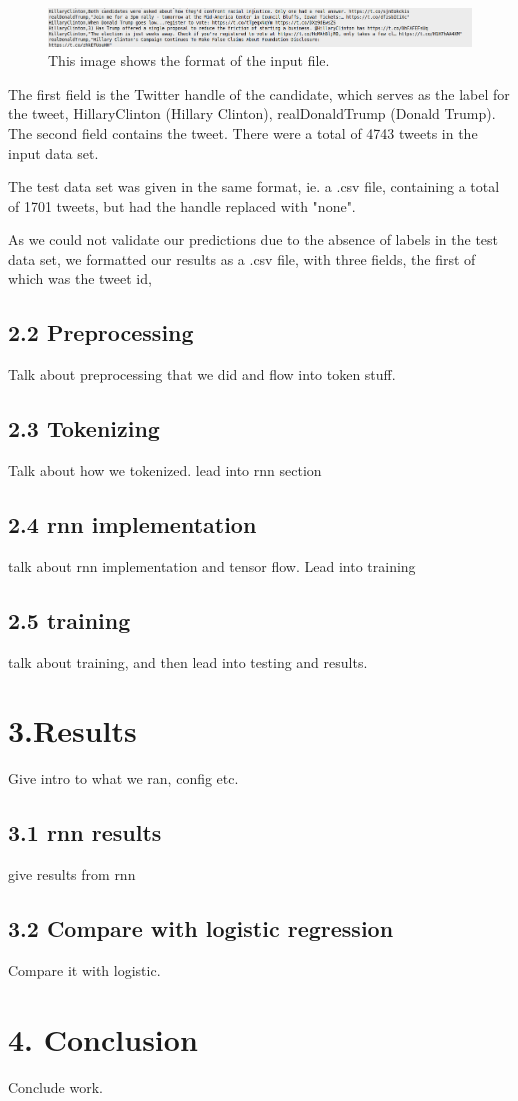 \documentclass[12pt]{report}
\begin{document}
\begin{figure}[h]
\centering
\includegraphics[scale=.36]{inputs.png}
\caption{This image shows the format of the input file.} \label{input}
\end{figure}

The first field is the Twitter handle of the candidate, which serves as the label for the tweet, HillaryClinton (Hillary Clinton), realDonaldTrump (Donald Trump). The second field contains the tweet. There were a total of 4743 tweets in the input data set.

The test data set was given in the same format, ie. a .csv file, containing a total of 1701 tweets, but had the handle replaced with "none". 

	As we could not validate our predictions due to the absence of labels in the test data set, we formatted our results as a .csv file, with three fields, the first of which was the tweet id,
\subsection*{2.2 Preprocessing }

Talk about preprocessing that we did and flow into token stuff.

\subsection*{2.3 Tokenizing}

Talk about how we tokenized. lead into rnn section

\subsection*{2.4 rnn implementation}

talk about rnn implementation and tensor flow. Lead into training

\subsection*{2.5 training}
talk about training, and then lead into testing and results.

\section*{3.Results}

Give intro to what we ran, config etc.

\subsection*{3.1 rnn results}

give results from rnn

\subsection*{3.2 Compare with logistic regression}

Compare it with logistic.

\section*{4. Conclusion}
Conclude work.
\end{document}
